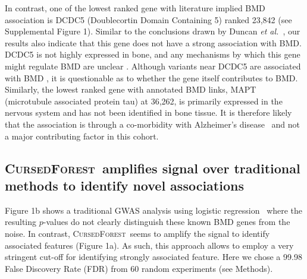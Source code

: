 \documentclass[10pt,letterpaper]{article}
\newcommand{\cursedforest}{\textsc{CursedForest}\xspace}
\begin{document}
In contrast, one of the lowest ranked gene with literature implied BMD association is DCDC5 (Doublecortin Domain Containing 5) ranked 23,842
(see Supplemental Figure 1). Similar to the conclusions drawn by Duncan {\it et
  al.}~\cite{Duncan.2011}, our results also indicate that this gene does not have a strong association with BMD. DCDC5 is not highly expressed in bone, and any mechanisms by which this gene might regulate BMD are unclear
\cite{Thakker2012}.  Although variants near DCDC5 are associated with BMD \cite{Rivadeneira2009}, it is questionable as
to whether the gene itself contributes to BMD.
Similarly, the lowest ranked gene with annotated BMD links, MAPT (microtubule associated protein tau) at 36,262, is primarily expressed in the nervous system and has not been identified in bone tissue. 
It is therefore likely that the association is through a co-morbidity with Alzheimer's disease~\cite{Dengler-Crish2017} and not a major contributing factor in this cohort. 


\subsection{\cursedforest\ amplifies signal over traditional methods to identify novel associations}

Figure 1b shows a traditional GWAS analysis using logistic regression~\cite{Duncan.2011} where the resulting $p$-values do not clearly distinguish these known BMD genes from the noise. 
In contrast, \cursedforest\ seems to amplify the signal to identify associated features (Figure 1a). 
As such, this approach allows to employ a very stringent cut-off for identifying strongly associated feature. Here we chose a 99.98 False Discovery Rate (FDR) from 60 random experiments (see Methods). 

\end{document}

